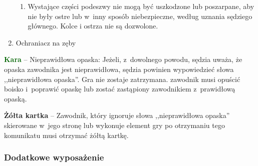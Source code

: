 \documentclass[12pt,a4paper]{article}
\newcommand\yellowcard[1]{\bgroup\textcolor{darkyellow}{\textbf{#1}}}
\newcommand\other[1]{\bgroup\textcolor{darkgreen}{\textbf{#1}}}
\begin{document}
\begin{enumerate}
	      \begin{enumerate}
		      \item
		            Wystające części podeszwy nie mogą być uszkodzone lub poszarpane,
		            aby nie były ostre lub w~inny sposób niebezpieczne, według uznania
		            sędziego głównego. Kolce i ostrza nie są dozwolone.
	      \end{enumerate}
	\item
	      Ochraniacz na zęby
\end{enumerate}

\other{Kara} -- Nieprawidłowa opaska: Jeżeli, z~dowolnego powodu, sędzia
uważa, że opaska zawodnika jest nieprawidłowa, sędzia powinien
wypowiedzieć słowa ,,nieprawidłowa opaska''. Gra nie zostaje zatrzymana.
zawodnik musi opuścić boisko i~poprawić opaskę lub zostać zastąpiony
zawodnikiem z~prawidłową opaską.

\yellowcard{Żółta kartka} -- Zawodnik, który ignoruje słowa ,,nieprawidłowa
opaska'' skierowane w~jego stronę lub wykonuje element gry po otrzymaniu
tego komunikatu musi otrzymać żółtą kartkę.

\subsubsection{Dodatkowe wyposażenie}
\end{document}
